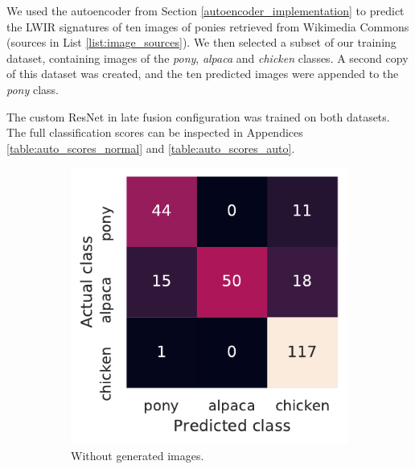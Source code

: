\documentclass{l4proj}
\begin{document}
We used the autoencoder from Section \ref{autoencoder_implementation} to predict the LWIR signatures of ten images of ponies retrieved from Wikimedia Commons (sources in List \ref{list:image_sources}). We then selected a subset of our training dataset, containing images of the \textit{pony}, \textit{alpaca} and \textit{chicken} classes. A second copy of this dataset was created, and the ten predicted images were appended to the \textit{pony} class.

The custom ResNet in late fusion configuration was trained on both datasets. The full classification scores can be inspected in Appendices \ref{table:auto_scores_normal} and \ref{table:auto_scores_auto}. 

\begin{figure}[ht]
  \centering
  \begin{subfigure}[h!]{0.3\textwidth}
    \includegraphics[width=\textwidth]{images/evaluation/autoencoder/confusion_normal}
    \caption{Without generated images.}
    \label{fig:auto_confusion_normal}
  \end{subfigure}
  \begin{subfigure}[h!]{0.3\textwidth}

\end{subfigure}
\end{figure}
\end{document}
